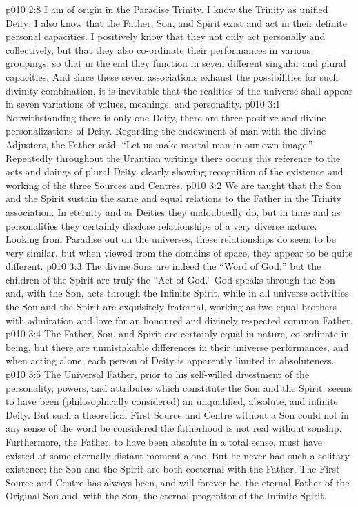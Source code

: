 \vs p010 2:8 I am of origin in the Paradise Trinity. I know the Trinity as unified Deity; I also know that the Father, Son, and Spirit exist and act in their definite personal capacities. I positively know that they not only act personally and collectively, but that they also co\hyp{}ordinate their performances in various groupings, so that in the end they function in seven different singular and plural capacities. And since these seven associations exhaust the possibilities for such divinity combination, it is inevitable that the realities of the universe shall appear in seven variations of values, meanings, and personality.
\vs p010 3:1 Notwithstanding there is only one Deity, there are three positive and divine personalizations of Deity. Regarding the endowment of man with the divine Adjusters, the Father said: “Let us make mortal man in our own image.” Repeatedly throughout the Urantian writings there occurs this reference to the acts and doings of plural Deity, clearly showing recognition of the existence and working of the three Sources and Centres.
\vs p010 3:2 \pc We are taught that the Son and the Spirit sustain the same and equal relations to the Father in the Trinity association. In eternity and as Deities they undoubtedly do, but in time and as personalities they certainly disclose relationships of a very diverse nature. Looking from Paradise out on the universes, these relationships do seem to be very similar, but when viewed from the domains of space, they appear to be quite different.
\vs p010 3:3 The divine Sons are indeed the “Word of God,” but the children of the Spirit are truly the “Act of God.” God speaks through the Son and, with the Son, acts through the Infinite Spirit, while in all universe activities the Son and the Spirit are exquisitely fraternal, working as two equal brothers with admiration and love for an honoured and divinely respected common Father.
\vs p010 3:4 The Father, Son, and Spirit are certainly equal in nature, co\hyp{}ordinate in being, but there are unmistakable differences in their universe performances, and when acting alone, each person of Deity is apparently limited in absoluteness.
\vs p010 3:5 \pc The Universal Father, prior to his self\hyp{}willed divestment of the personality, powers, and attributes which constitute the Son and the Spirit, seems to have been (philosophically considered) an unqualified, absolute, and infinite Deity. But such a theoretical First Source and Centre without a Son could not in any sense of the word be considered the  fatherhood is not real without sonship. Furthermore, the Father, to have been absolute in a total sense, must have existed at some eternally distant moment alone. But he never had such a solitary existence; the Son and the Spirit are both coeternal with the Father. The First Source and Centre has always been, and will forever be, the eternal Father of the Original Son and, with the Son, the eternal progenitor of the Infinite Spirit.
